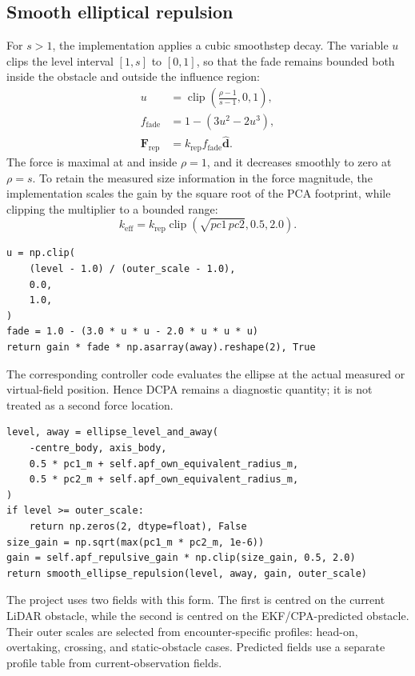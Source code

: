 \documentclass[11pt,a4paper]{article}
\begin{document}
\subsection{Smooth elliptical repulsion}

For $s>1$, the implementation applies a cubic smoothstep decay. The variable
$u$ clips the level interval $[1,s]$ to $[0,1]$, so that the fade remains
bounded both inside the obstacle and outside the influence region:
\begin{align}
u&=\operatorname{clip}\left(\frac{\rho-1}{s-1},0,1\right),\\
f_{\mathrm{fade}}&=1-(3u^2-2u^3),\\
\bm{F}_{\mathrm{rep}}&=k_{\mathrm{rep}}f_{\mathrm{fade}}\hat{\bm{d}}.
\end{align}
The force is maximal at and inside $\rho=1$, and it decreases smoothly to zero at $\rho=s$. To retain the measured size information in the force magnitude, the implementation scales the gain by the square root of the PCA footprint, while clipping the multiplier to a bounded range:
\begin{equation}
k_{\mathrm{eff}}=k_{\mathrm{rep}}\operatorname{clip}
\left(\sqrt{pc1\,pc2},0.5,2.0\right).
\end{equation}

\begin{lstlisting}
u = np.clip(
    (level - 1.0) / (outer_scale - 1.0),
    0.0,
    1.0,
)
fade = 1.0 - (3.0 * u * u - 2.0 * u * u * u)
return gain * fade * np.asarray(away).reshape(2), True
\end{lstlisting}

The corresponding controller code evaluates the ellipse at the actual
measured or virtual-field position. Hence DCPA remains a diagnostic quantity;
it is not treated as a second force location.

\begin{lstlisting}
level, away = ellipse_level_and_away(
    -centre_body, axis_body,
    0.5 * pc1_m + self.apf_own_equivalent_radius_m,
    0.5 * pc2_m + self.apf_own_equivalent_radius_m,
)
if level >= outer_scale:
    return np.zeros(2, dtype=float), False
size_gain = np.sqrt(max(pc1_m * pc2_m, 1e-6))
gain = self.apf_repulsive_gain * np.clip(size_gain, 0.5, 2.0)
return smooth_ellipse_repulsion(level, away, gain, outer_scale)
\end{lstlisting}

The project uses two fields with this form. The first is centred on the current LiDAR obstacle, while the second is centred on the EKF/CPA-predicted obstacle. Their outer scales are selected from encounter-specific profiles: head-on, overtaking, crossing, and static-obstacle cases. Predicted fields use a separate profile table from current-observation fields.
\end{document}
